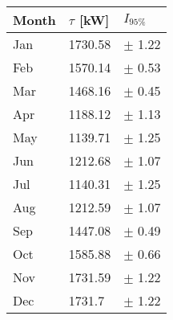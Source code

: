 \begin{tabular}{lll}
\toprule
Month & $\tau$ [kW] &  $I_{95\%}$ \\
\midrule
  Jan &     1730.58 &  $\pm$ 1.22 \\
  Feb &     1570.14 &  $\pm$ 0.53 \\
  Mar &     1468.16 &  $\pm$ 0.45 \\
  Apr &     1188.12 &  $\pm$ 1.13 \\
  May &     1139.71 &  $\pm$ 1.25 \\
  Jun &     1212.68 &  $\pm$ 1.07 \\
  Jul &     1140.31 &  $\pm$ 1.25 \\
  Aug &     1212.59 &  $\pm$ 1.07 \\
  Sep &     1447.08 &  $\pm$ 0.49 \\
  Oct &     1585.88 &  $\pm$ 0.66 \\
  Nov &     1731.59 &  $\pm$ 1.22 \\
  Dec &      1731.7 &  $\pm$ 1.22 \\
\bottomrule
\end{tabular}
